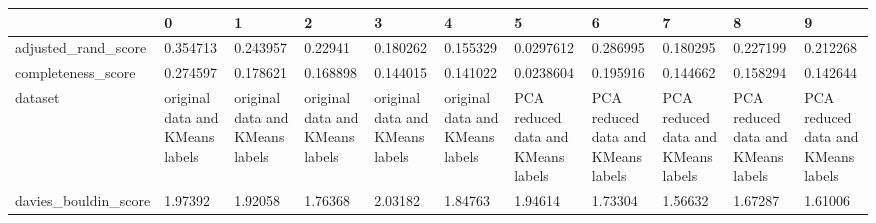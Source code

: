\begin{tabular}{lllllllllll}
\toprule
{} &                                                  0 &                                                  1 &                                                  2 &                                                  3 &                                                  4 &                                                  5 &                                                  6 &                                                  7 &                                                  8 &                                                  9 \\
\midrule
adjusted\_rand\_score   &                                           0.354713 &                                           0.243957 &                                            0.22941 &                                           0.180262 &                                           0.155329 &                                          0.0297612 &                                           0.286995 &                                           0.180295 &                                           0.227199 &                                           0.212268 \\
completeness\_score    &                                           0.274597 &                                           0.178621 &                                           0.168898 &                                           0.144015 &                                           0.141022 &                                          0.0238604 &                                           0.195916 &                                           0.144662 &                                           0.158294 &                                           0.142644 \\
dataset               &                    original data and KMeans labels &                    original data and KMeans labels &                    original data and KMeans labels &                    original data and KMeans labels &                    original data and KMeans labels &                 PCA reduced data and KMeans labels &                 PCA reduced data and KMeans labels &                 PCA reduced data and KMeans labels &                 PCA reduced data and KMeans labels &                 PCA reduced data and KMeans labels \\
davies\_bouldin\_score  &                                            1.97392 &                                            1.92058 &                                            1.76368 &                                            2.03182 &                                            1.84763 &                                            1.94614 &                                            1.73304 &                                            1.56632 &                                            1.67287 &                                            1.61006 \\

\end{tabular}
